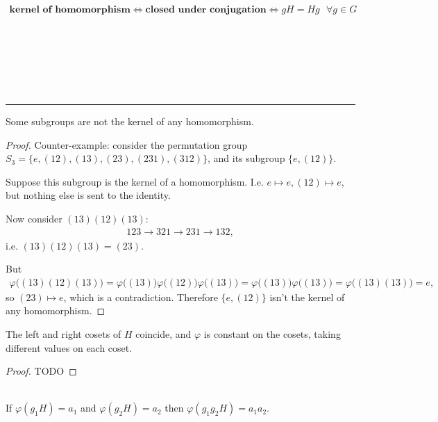 \begin{theorem}
\begin{align*}
  \textbf{kernel of homomorphism} \iff \textbf{closed under conjugation} \iff gH = Hg ~~~ \forall g \in G
\end{align*}
\end{theorem}

~\\~\\~\\~\\~\\
\hrule
\begin{theorem*}
  Some subgroups are not the kernel of any homomorphism.
\end{theorem*}

\begin{proof} \label{some-subgroups-not-kernel}
Counter-example: consider the permutation group
$S_3 = \{e, (12), (13), (23), (231), (312)\}$, and its subgroup $\{e,
(12)\}$.

Suppose this subgroup is the kernel of a homomorphism. I.e.
$e \mapsto e, (12) \mapsto e$, but nothing else is sent to the identity.

Now consider $(13)(12)(13)$:
\begin{align*}
  123 \to 321 \to 231 \to 132,
\end{align*}
i.e. $(13)(12)(13) = (23)$.

But
\begin{align*}
  \varphi\Big((13)(12)(13)\Big) =
  \varphi\Big((13)\Big) \varphi\Big((12)\Big) \varphi\Big((13)\Big) =
  \varphi\Big((13)\Big) \varphi\Big((13)\Big) = \varphi\Big((13)(13)\Big) = e,
\end{align*}
so $(23) \mapsto e$, which is a contradiction. Therefore $\{e,(12)\}$ isn't the
kernel of any homomorphism.
\end{proof}

\begin{theorem*}
  The left and right cosets of $H$ coincide, and $\varphi$ is constant on the
  cosets, taking different values on each coset.
\end{theorem*}

\begin{proof}
  TODO
\end{proof}


\begin{theorem*}~\\
  If $\varphi(g_1H) = a_1$ and $\varphi(g_2H) = a_2$ then
  $\varphi(g_1g_2H) = a_1a_2$.
\end{theorem*}

